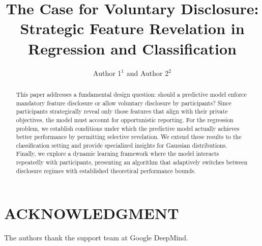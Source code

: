 \documentclass[letterpaper, 11pt]{article} %
\title{The Case for Voluntary Disclosure: Strategic Feature Revelation in Regression and Classification}
\author{Author 1$^{1}$ and Author 2$^{2}$}
\date{}
\begin{document}
\maketitle
\pagestyle{plain}

\begin{abstract}
This paper addresses a fundamental design question: should a predictive model enforce mandatory feature disclosure or allow voluntary disclosure by participants? Since participants strategically reveal only those features that align with their private objectives, the model must account for opportunistic reporting. For the regression problem, we establish conditions under which the predictive model actually achieves better performance by permitting selective revelation. We extend these results to the classification setting and provide specialized insights for Gaussian distributions. Finally, we explore a dynamic learning framework where the model interacts repeatedly with participants, presenting an algorithm that adaptively switches between disclosure regimes with established theoretical performance bounds.
\end{abstract}














\section*{ACKNOWLEDGMENT}
The authors thank the support team at Google DeepMind.




\end{document}

